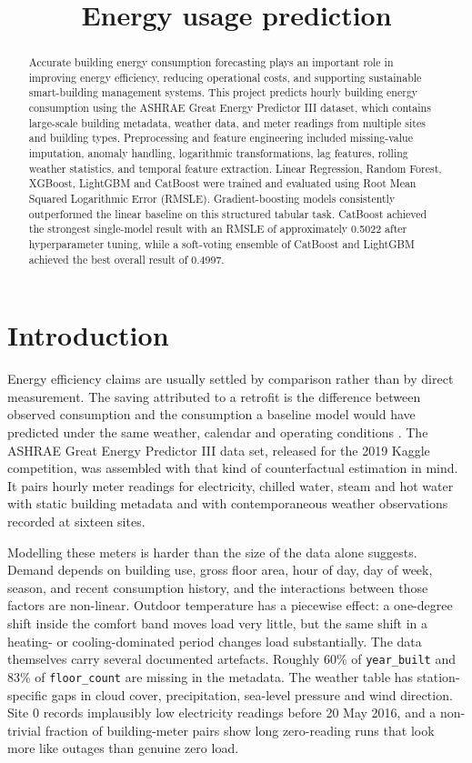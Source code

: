 \documentclass{article}
\title{Energy usage prediction}
\date{}
\begin{document}
\maketitle

\begin{abstract}
Accurate building energy consumption forecasting plays an important role in improving energy efficiency, reducing operational costs, and supporting sustainable smart-building management systems. This project predicts hourly building energy consumption using the ASHRAE Great Energy Predictor III dataset, which contains large-scale building metadata, weather data, and meter readings from multiple sites and building types. Preprocessing and feature engineering included missing-value imputation, anomaly handling, logarithmic transformations, lag features, rolling weather statistics, and temporal feature extraction. Linear Regression, Random Forest, XGBoost, LightGBM and CatBoost were trained and evaluated using Root Mean Squared Logarithmic Error (RMSLE). Gradient-boosting models consistently outperformed the linear baseline on this structured tabular task. CatBoost achieved the strongest single-model result with an RMSLE of approximately 0.5022 after hyperparameter tuning, while a soft-voting ensemble of CatBoost and LightGBM achieved the best overall result of 0.4997.

\end{abstract}

\section{Introduction}

Energy efficiency claims are usually settled by comparison rather than by direct measurement. The saving attributed to a retrofit is the difference between observed consumption and the consumption a baseline model would have predicted under the same weather, calendar and operating conditions \cite{miller2020}. The ASHRAE Great Energy Predictor III data set, released for the 2019 Kaggle competition, was assembled with that kind of counterfactual estimation in mind. It pairs hourly meter readings for electricity, chilled water, steam and hot water with static building metadata and with contemporaneous weather observations recorded at sixteen sites.

Modelling these meters is harder than the size of the data alone suggests. Demand depends on building use, gross floor area, hour of day, day of week, season, and recent consumption history, and the interactions between those factors are non-linear. Outdoor temperature has a piecewise effect: a one-degree shift inside the comfort band moves load very little, but the same shift in a heating- or cooling-dominated period changes load substantially. The data themselves carry several documented artefacts. Roughly 60\% of \texttt{year\_built} and 83\% of \texttt{floor\_count} are missing in the metadata. The weather table has station-specific gaps in cloud cover, precipitation, sea-level pressure and wind direction. Site 0 records implausibly low electricity readings before 20 May 2016, and a non-trivial fraction of building-meter pairs show long zero-reading runs that look more like outages than genuine zero load.
\end{document}
